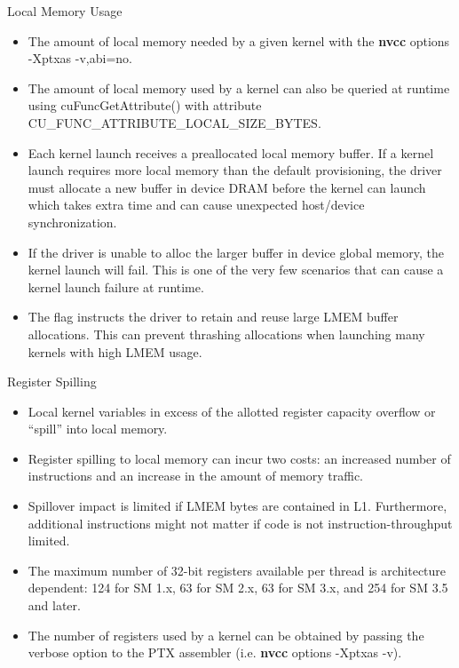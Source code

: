 \documentclass[handout]{beamer}
\begin{document}
\begin{frame}{Local Memory Usage}
\begin{itemize}
	\item<1->The amount of local memory needed by a given kernel with the {\selectfont \textbf{nvcc}} options {\selectfont -Xptxas -v,abi=no}.
	\item<1->The amount of local memory used by a kernel can also be queried at runtime using {\selectfont cuFuncGetAttribute()} with attribute {\selectfont CU\_FUNC\_ATTRIBUTE\_LOCAL\_SIZE\_BYTES}.
	\item<1->Each kernel launch receives a preallocated local memory buffer.  If a kernel launch requires more local memory than the default provisioning, the driver must allocate a new buffer in device DRAM before the kernel can launch which takes extra time and can cause unexpected host/device synchronization.
	\item<1->If the driver is unable to alloc the larger buffer in device global memory, the kernel launch will fail.  This is one of the very few scenarios that can cause a kernel launch failure at runtime.
	\item<1->The flag \href{http://docs.nvidia.com/cuda/cuda-runtime-api/group__CUDART__DEVICE.html}{} instructs the driver to retain and reuse large LMEM buffer allocations. This can prevent thrashing allocations when launching many kernels with high LMEM usage.
\end{itemize}
\end{frame}

\begin{frame}{Register Spilling}
\begin{itemize}
	\item<1->Local kernel variables in excess of the allotted register capacity overflow or ``spill'' into local memory.
	\item<1->Register spilling to local memory can incur two costs: an increased number of instructions and an increase in the amount of memory traffic.  
	\item<1->Spillover impact is limited if LMEM bytes are contained in L1.  Furthermore, additional instructions might not matter if code is not instruction-throughput limited.
	\item<1->The maximum number of 32-bit registers available per thread is architecture dependent: 124 for SM 1.x, 63 for SM 2.x, 63 for SM 3.x, and 254 for SM 3.5 and later.
	\item<1->The number of registers used by a kernel can be obtained by passing the verbose option to the PTX assembler (i.e. {\selectfont \textbf{nvcc}} options {\selectfont -Xptxas -v}).
\end{itemize}
\end{frame}
\end{document}
